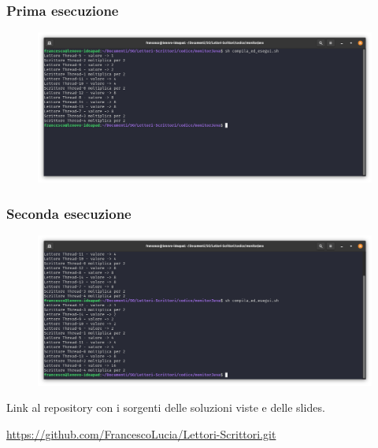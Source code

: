 \documentclass{beamer}[10pt]
\begin{document}
	\begin{frame}[fragile]
		\frametitle{Prima esecuzione}
		\begin{figure}
			\centering
			\includegraphics[width=1.03\linewidth]{img/esecuzione/programJ1}
			\label{fig:programc1}
		\end{figure}
	\end{frame}

	\begin{frame}[fragile]
		\frametitle{Seconda esecuzione}
		\begin{figure}
			\centering
			\includegraphics[width=1.03\linewidth]{img/esecuzione/programJ2}
			\label{fig:programc1}
		\end{figure}
	\end{frame}
	

	
	
	\begin{frame}
		\centerline{Link al repository con i sorgenti delle soluzioni viste e delle slides.}
		
		\centerline{\href{https://github.com/FrancescoLucia/Lettori-Scrittori.git}{https://github.com/FrancescoLucia/Lettori-Scrittori.git}}
	\end{frame}
	
	
\end{document}
